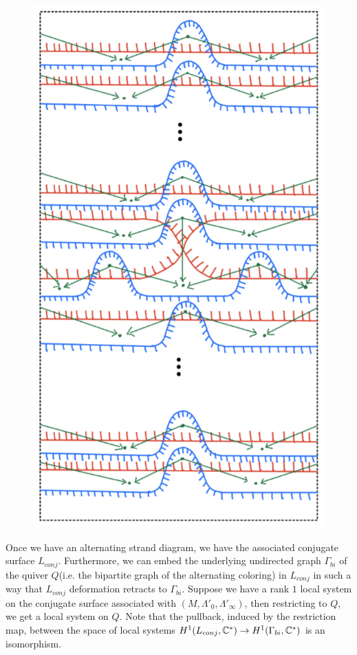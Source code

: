 \begin{figure}[H] 
    \centering
    \includegraphics[scale = 0.95]{diagrams/local_systems_on_as_diagrams/2.png} 
    \caption{}
    \label{fig:your-label}
\end{figure}

Once we have an alternating strand diagram, we have the associated conjugate surface $L_{conj}$. Furthermore, we can embed the underlying undirected graph $\Gamma_{bi}$ of the quiver $Q$(i.e. the bipartite graph of the alternating coloring) in $L_{conj}$ in such a way that $L_{conj}$ deformation retracts to $\Gamma_{bi}$. Suppose we have a rank $1$ local system on the conjugate surface associated with $(M, \Lambda'_0, \Lambda'_\infty)$, then restricting to $Q$, we get a local system on $Q$. Note that the pullback, induced by the restriction map, between the space of local systems $H^1(L_{conj}, \mathbb{C}^*) \rightarrow  H^1(\Gamma_{bi},\mathbb{C}^*)$ is an isomorphism.

